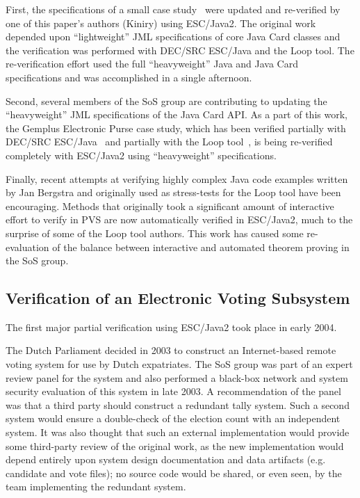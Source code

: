 \documentclass{llncs}
\begin{document}
First, the specifications of a small case
study~\cite{BreunesseJacobsBerg02} were updated and re-verified by one
of this paper's authors (Kiniry) using ESC/Java2.  The original work
depended upon ``light\-weight'' JML specifications of core Java Card
classes and the verification was performed with DEC/SRC ESC/Java and
the Loop tool.  The re-verification effort used the full
``heavyweight'' Java and Java Card specifications and was accomplished
in a single afternoon.

Second, several members of the SoS group are contributing to updating
the ``heavyweight'' JML specifications of the Java Card API.  As a
part of this work, the Gemplus Electronic Purse case study, which has
been verified partially with DEC/SRC ESC/Java~\cite{CatanoHuisman02}
and partially with the Loop tool~\cite{BreunesseJacobsBerg02}, is
being re-verified completely with ESC/Java2 using ``heavyweight''
specifications.

Finally, recent attempts at verifying highly complex Java code
examples written by Jan Bergstra and originally used as stress-tests
for the Loop tool have been encouraging.  Methods that originally took
a significant amount of interactive effort to verify in PVS are now
automatically verified in ESC/Java2, much to the surprise of some of
the Loop tool authors.  This work has caused some re-evaluation of the
balance between interactive and automated theorem proving in the SoS
group.

\subsection{Verification of an Electronic Voting Subsystem}

The first major partial verification using ESC/Java2 took place in
early 2004.

The Dutch Parliament decided in 2003 to construct an Internet-based
remote voting system for use by Dutch expatriates.  The SoS group was
part of an expert review panel for the system and also performed a
black-box network and system security evaluation of this system in
late 2003.  A recommendation of the panel was that a third party
should construct a redundant tally system.  Such a second system would
ensure a double-check of the election count with an independent
system.  It was also thought that such an external implementation
would provide some third-party review of the original work, as the new
implementation would depend entirely upon system design documentation
and data artifacts (e.g. candidate and vote files); no source code
would be shared, or even seen, by the team implementing the redundant
system.
\end{document}
